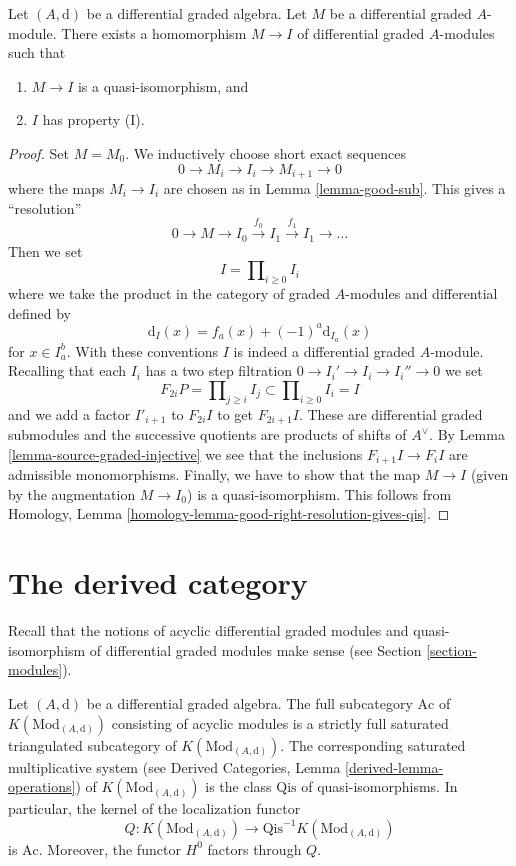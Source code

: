 \begin{lemma}
\label{lemma-right-resolution}
Let $(A, \text{d})$ be a differential graded algebra.
Let $M$ be a differential graded $A$-module. There exists a homomorphism
$M \to I$ of differential graded $A$-modules such that
\begin{enumerate}
\item $M \to I$ is a quasi-isomorphism, and
\item $I$ has property (I).
\end{enumerate}
\end{lemma}

\begin{proof}
Set $M = M_0$. We inductively choose short exact sequences
$$
0 \to M_i \to I_i \to M_{i + 1} \to 0
$$
where the maps $M_i \to I_i$ are chosen as in Lemma \ref{lemma-good-sub}.
This gives a ``resolution''
$$
0 \to M \to I_0 \xrightarrow{f_0} I_1 \xrightarrow{f_1} I_1 \to \ldots
$$
Then we set
$$
I = \prod\nolimits_{i \geq 0} I_i
$$
where we take the product in the category of graded $A$-modules
and differential defined by
$$
\text{d}_I(x) = f_a(x) + (-1)^a \text{d}_{I_a}(x)
$$
for $x \in I_a^b$. With these conventions $I$ is indeed a differential
graded $A$-module. Recalling that each $I_i$ has a two step filtration
$0 \to I_i' \to I_i \to I_i'' \to 0$ we set
$$
F_{2i}P = \prod\nolimits_{j \geq i} I_j
\subset
\prod\nolimits_{i \geq 0} I_i = I
$$
and we add a factor $I'_{i + 1}$ to $F_{2i}I$ to get $F_{2i + 1}I$.
These are differential graded submodules and the successive quotients
are products of shifts of $A^\vee$. By
Lemma \ref{lemma-source-graded-injective} we see that
the inclusions $F_{i + 1}I \to F_iI$ are admissible monomorphisms.
Finally, we have to show that the map $M \to I$ (given by the
augmentation $M \to I_0$) is a quasi-isomorphism. This follows from
Homology, Lemma \ref{homology-lemma-good-right-resolution-gives-qis}.
\end{proof}






\section{The derived category}
\label{section-derived}

\noindent
Recall that the notions of acyclic differential graded modules
and quasi-isomorphism of differential graded modules make sense
(see Section \ref{section-modules}).

\begin{lemma}
\label{lemma-acyclic}
Let $(A, \text{d})$ be a differential graded algebra.
The full subcategory $\text{Ac}$ of $K(\text{Mod}_{(A, \text{d})})$
consisting of acyclic modules is a strictly full saturated triangulated
subcategory of $K(\text{Mod}_{(A, \text{d})})$.
The corresponding saturated multiplicative system
(see Derived Categories, Lemma \ref{derived-lemma-operations})
of $K(\text{Mod}_{(A, \text{d})})$ is the class $\text{Qis}$
of quasi-isomorphisms. In particular, the kernel of the localization
functor
$$
Q : K(\text{Mod}_{(A, \text{d})}) \to
\text{Qis}^{-1}K(\text{Mod}_{(A, \text{d})})
$$
is $\text{Ac}$. Moreover, the functor $H^0$ factors through $Q$.
\end{lemma}

